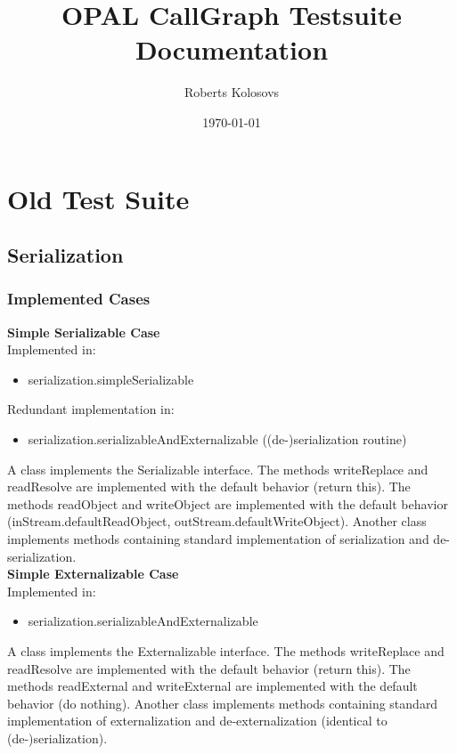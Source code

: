 \documentclass{article}
\title{OPAL CallGraph Testsuite Documentation}
\author{Roberts Kolosovs}
\date{\today}
\begin{document}
\maketitle

\section{Old Test Suite}
\subsection{Serialization}
\subsubsection{Implemented Cases}

\textbf{Simple Serializable Case}\\
Implemented in: 
\begin{itemize}
    \item serialization.simpleSerializable
\end{itemize}
Redundant implementation in: 
\begin{itemize}
    \item serialization.serializableAndExternalizable ((de-)serialization routine)
\end{itemize}
A class implements the Serializable interface. The methods writeReplace and readResolve are implemented with the default behavior (return this). The methods readObject and writeObject are implemented with the default behavior (inStream.defaultReadObject, outStream.defaultWriteObject). Another class implements methods containing standard implementation of serialization and de-serialization.\\

\noindent
\textbf{Simple Externalizable Case}\\
Implemented in: 
\begin{itemize}
    \item serialization.serializableAndExternalizable
\end{itemize}
A class implements the Externalizable interface. The methods writeReplace and readResolve are implemented with the default behavior (return this). The methods readExternal and writeExternal are implemented with the default behavior (do nothing). Another class implements methods containing standard implementation of externalization and de-externalization (identical to (de-)serialization).\\
\end{document}
